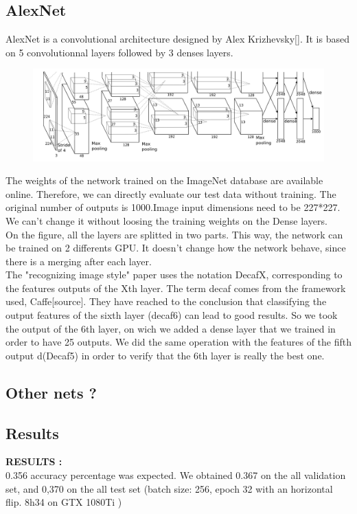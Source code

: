 \subsection{AlexNet}
AlexNet is a convolutional architecture designed by Alex Krizhevsky[]. It is based on 5 convolutionnal layers followed by 3 denses layers.
\begin{figure}
   	\includegraphics[scale = 0.2]{images/alexnet_architecture.png}
\end{figure}

The weights of the network trained on the ImageNet database are available online. Therefore, we can directly evaluate our test data without training. The original number of outputs is 1000.Image input dimensions need to be 227*227. We can't change it without loosing the training weights on the Dense layers.\\
On the figure, all the layers are splitted in two parts. This way, the network can be trained on 2 differents GPU. It doesn't change how the network behave, since there is a merging after each layer. \\
The "recognizing image style" paper uses the notation DecafX, corresponding to the features outputs of the Xth layer. The term decaf comes from the framework used, Caffe[source]. They have reached to the conclusion that classifying the output features of the sixth layer (decaf6) can lead to good results. So we took the output of the 6th layer, on wich we added a dense layer that we trained in order to have 25 outputs. We did the same operation with the features of the fifth output d(Decaf5) in order to verify that the 6th layer is really the best one.\\


\subsection{Other nets ?}


\subsection{Results}
	\textbf{RESULTS :}\\
	0.356 accuracy percentage was expected. We obtained 0.367 on the all validation set, and 0,370 on the all test set (batch size: 256, epoch 32 with an horizontal flip. 8h34 on GTX 1080Ti )\\
	
